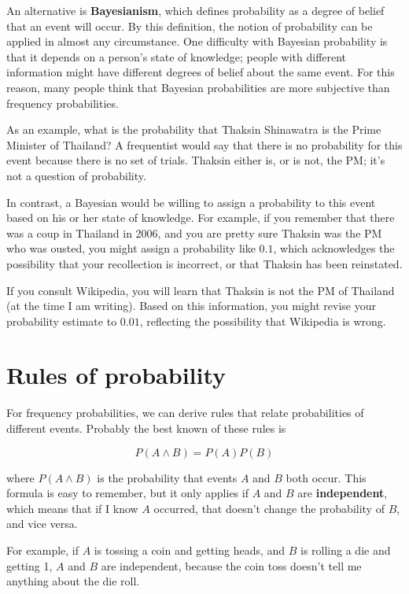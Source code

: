 \documentclass[12pt]{book}
\begin{document}
An alternative is {\bf Bayesianism}, which defines probability as
a degree of belief that an event will occur.  By this definition,
the notion of probability can be applied in almost any circumstance.
One difficulty with Bayesian probability is that it depends on
a person's state of knowledge; people with different information
might have different degrees of belief about the same event.  For
this reason, many people think that Bayesian probabilities are
more subjective than frequency probabilities.

As an example, what is the probability that Thaksin Shinawatra is the
Prime Minister of Thailand?  A frequentist would say that there is no
probability for this event because there is no set of
trials.  Thaksin either is, or is not, the PM; it's not a question of
probability.

In contrast, a Bayesian would be willing to assign a probability to
this event based on his or her state of knowledge.  For example, if
you remember that there was a coup in Thailand in 2006, and you are
pretty sure Thaksin was the PM who was ousted, you might
assign a probability like $0.1$, which acknowledges the possibility
that your recollection is incorrect, or that Thaksin has been
reinstated.

If you consult Wikipedia, you will learn that Thaksin is not the
PM of Thailand (at the time I am writing).  Based on this
information, you might revise your probability estimate to $0.01$,
reflecting the possibility that Wikipedia is wrong.


\section{Rules of probability}

For frequency probabilities, we can derive rules that relate
probabilities of different events.  Probably the best known of these
rules is

\renewcommand{\and}{\wedge}

\[ P(A \and B) = P(A) P(B) \]

where $P(A \and B)$ is the probability that events $A$ and $B$ both
occur.  This formula is easy to remember, but it only applies if $A$
and $B$ are {\bf independent}, which means that if I know $A$
occurred, that doesn't change the probability of $B$, and vice versa.

For example, if $A$ is tossing a coin and getting heads, and $B$
is rolling a die and getting 1, $A$ and $B$ are independent, because
the coin toss doesn't tell me anything about the die roll.
\end{document}
